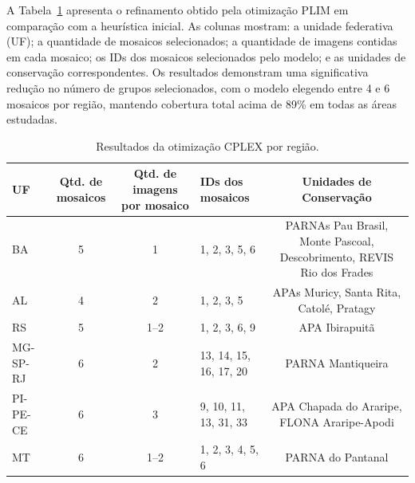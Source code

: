 \documentclass[a4paper,11pt]{article}
\begin{document}
A Tabela~\ref{tab:resultados_cplex} apresenta o refinamento obtido pela otimização PLIM em comparação com a heurística inicial. As colunas mostram: a unidade federativa (UF); a quantidade de mosaicos selecionados; a quantidade de imagens contidas em cada mosaico; os IDs dos mosaicos selecionados pelo modelo; e as unidades de conservação correspondentes. Os resultados demonstram uma significativa redução no número de grupos selecionados, com o modelo elegendo entre 4 e 6 mosaicos por região, mantendo cobertura total acima de 89\% em todas as áreas estudadas.
\vspace{-5mm}
\begin{table}[htbp]
    \centering
    \caption{Resultados da otimização CPLEX por região.}
    \label{tab:resultados_cplex}
    \begin{adjustbox}{width=\textwidth}
    \begin{tabular}{@{}lccp{3.6cm}c@{}}
    \toprule
    \textbf{UF} & \textbf{Qtd. de mosaicos} & \textbf{Qtd. de imagens por mosaico} & \textbf{IDs dos mosaicos} & \textbf{Unidades de Conservação} \\
    \midrule
    BA      & 5 & 1 & 1, 2, 3, 5, 6 & PARNAs Pau Brasil, Monte Pascoal, Descobrimento, REVIS Rio dos Frades \\
    AL      & 4 & 2 & 1, 2, 3, 5 & APAs Muricy, Santa Rita, Catolé, Pratagy \\
    RS      & 5 & 1--2 & 1, 2, 3, 6, 9 & APA Ibirapuitã \\
    MG-SP-RJ& 6 & 2 & 13, 14, 15, 16, 17, 20 & PARNA Mantiqueira \\
    PI-PE-CE& 6 & 3 & 9, 10, 11, 13, 31, 33 & APA Chapada do Araripe, FLONA Araripe-Apodi \\
    MT      & 6 & 1--2 & 1, 2, 3, 4, 5, 6 & PARNA do Pantanal \\
    \bottomrule
    \end{tabular}
    \end{adjustbox}
\end{table}
\vspace{-4mm}
\end{document}
